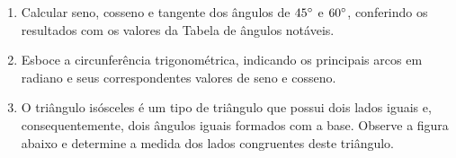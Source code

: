 \begin{enumerate}
     \item 	Calcular seno, cosseno e tangente dos ângulos de $45 \degree$ e $60 \degree$, conferindo os resultados com os valores da Tabela de ângulos notáveis.
    \item   Esboce a circunferência trigonométrica, indicando os principais arcos em radiano e seus correspondentes valores de seno e cosseno.
    \item   O triângulo isósceles é um tipo de triângulo que possui dois lados iguais e, consequentemente, dois ângulos iguais formados com a base. Observe a figura abaixo e determine a medida dos lados congruentes deste triângulo.
\begin{center}
\begin{tikzpicture}[x=0.75pt,y=0.75pt,yscale=-1,xscale=1]


\end{tikzpicture}
\end{center}
\end{enumerate}

